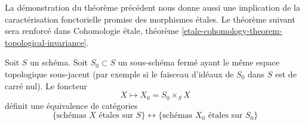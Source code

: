 \noindent
La démonstration du théorème précédent nous donne aussi une implication de la
caractérisation fonctorielle promise des morphismes \'etales. Le
théorème suivant sera renforcé dans
Cohomologie \'etale,
théorème \ref{etale-cohomology-theorem-topological-invariance}.

\begin{theorem}
\label{theorem-remarkable-equivalence}
\begin{reference}
\cite[IV, Theorem 18.1.2]{EGA}
\end{reference}
Soit $S$ un schéma.
Soit $S_0 \subset S$ un sous-schéma fermé ayant le même espace
topologique sous-jacent (par exemple si le faisceau d'idéaux de $S_0$ dans $S$
est de carré nul). Le foncteur
$$
X \longmapsto X_0 = S_0 \times_S X
$$
définit une équivalence de catégories
$$
\{
\text{schémas }X\text{ \'etales sur }S
\}
\leftrightarrow
\{
\text{schémas }X_0\text{ \'etales sur }S_0
\}
$$
\end{theorem}

